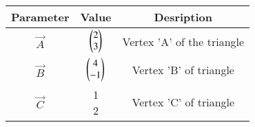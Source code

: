 
\begin{tabular}[]{|c|c|c|}
\hline
Parameter	& Value	& Desription \\ \hline
$\vec{A}$	& $\begin{pmatrix}2\\3\end{pmatrix}$ & Vertex 'A' of the triangle\\ \hline
$\vec{B}$	& $\begin{pmatrix}4\\-1\end{pmatrix}$ & Vertex 'B' of triangle\\ \hline
	$\vec{C}$		& \myvec{1\\2} & Vertex 'C' of triangle\\ \hline
\end{tabular}
